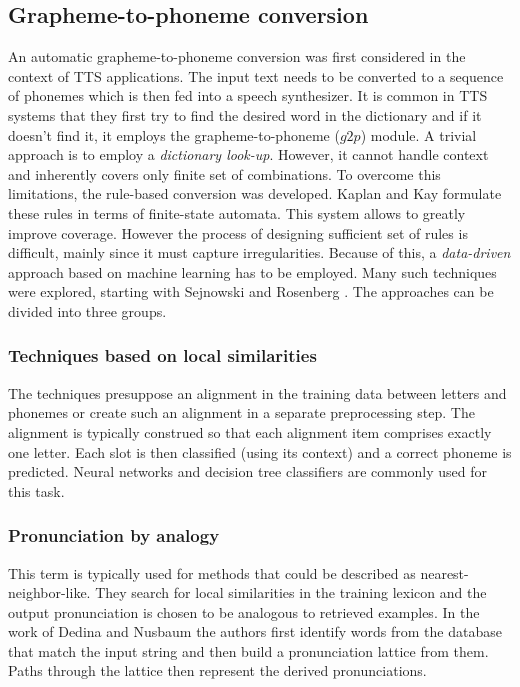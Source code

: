 \subsection{Grapheme-to-phoneme conversion}
An automatic grapheme-to-phoneme conversion was first considered in the context of TTS applications. The input text needs to be converted to a sequence of phonemes which is then fed into a speech synthesizer.
It is common in TTS systems that they first try to find the desired word in the dictionary and if it doesn't find it, it employs the grapheme-to-phoneme ($g2p$) module.
A trivial approach is to employ a \textit{dictionary look-up}.
However, it cannot handle context and inherently covers only finite set of combinations.
To overcome this limitations, the rule-based conversion was developed.
Kaplan and Kay \cite{kaplan1994regular} formulate these rules in terms of finite-state automata.
This system allows to greatly improve coverage.
However the process of designing sufficient set of rules is difficult, mainly since it must capture irregularities.
Because of this, a \textit{data-driven} approach based on machine learning has to be employed.
Many such techniques were explored, starting with Sejnowski and Rosenberg \cite{sejnowski1988nettalk}.
The approaches can be divided into three groups.
\subsubsection{Techniques based on local similarities}
The techniques presuppose an alignment in the training data between letters and phonemes or create such an alignment in a separate preprocessing step.
The alignment is typically construed so that each alignment item comprises exactly one letter.
Each slot is then classified (using its context) and a correct phoneme is predicted.
Neural networks and decision tree classifiers are commonly used for this task.
\subsubsection{Pronunciation by analogy}
This term is typically used for methods that could be described as nearest-neighbor-like.
They search for local similarities in the training lexicon and the output pronunciation is chosen to be analogous to retrieved examples. 
In the work of Dedina and Nusbaum \cite{dedina1991pronounce} the authors first identify words from the database that match the input string and then build a pronunciation lattice from them.
Paths through the lattice then represent the derived pronunciations.
